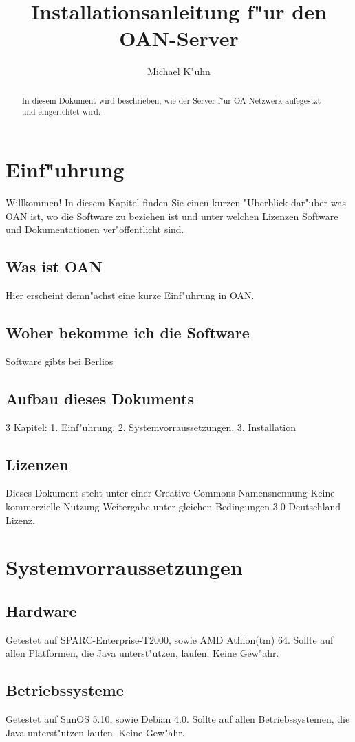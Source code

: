 \documentclass[a4paper,12pt]{scrreprt}
\title{Installationsanleitung f"ur den OAN-Server}
\author{Michael K"uhn}
\begin{document}
\maketitle
\tableofcontents

\begin{abstract}
In diesem Dokument wird beschrieben, wie der Server f"ur OA-Netzwerk aufegestzt und eingerichtet wird.
\end{abstract}

\chapter{Einf"uhrung}
Willkommen! In diesem Kapitel finden Sie einen kurzen "Uberblick dar"uber was OAN ist, wo die Software zu beziehen ist und unter welchen Lizenzen Software und Dokumentationen ver"offentlicht sind.
\section{Was ist OAN}
Hier erscheint demn"achst eine kurze Einf"uhrung in OAN.
\section{Woher bekomme ich die Software}
Software gibts bei Berlios
\section{Aufbau dieses Dokuments}
3 Kapitel: 1. Einf"uhrung, 2. Systemvorraussetzungen, 3. Installation
\section{Lizenzen}
Dieses Dokument steht unter einer Creative Commons Namensnennung-Keine kommerzielle Nutzung-Weitergabe unter gleichen Bedingungen 3.0 Deutschland Lizenz.
\chapter{Systemvorraussetzungen}
\section{Hardware}
Getestet auf SPARC-Enterprise-T2000, sowie AMD Athlon(tm) 64.
Sollte auf allen Platformen, die Java unterst"utzen, laufen. Keine Gew"ahr.
\section{Betriebssysteme}
Getestet auf SunOS 5.10, sowie Debian 4.0. Sollte auf allen Betriebssystemen, die Java unterst"utzen laufen. Keine Gew"ahr.
\end{document}
